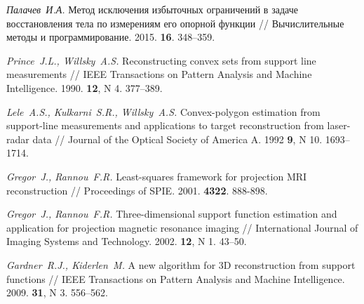 \documentclass[a4paper, 10pt]{article}
\theoremstyle{definition}
\theoremstyle{plain}
\theoremstyle{plain}
\begin{document}
\begin{thebibliography}{50}

\emph{Палачев~И.А.}
Метод исключения избыточных ограничений в задаче восстановления тела по
измерениям его опорной функции //
Вычислительные методы и программирование.
2015.
\textbf{16}.
348--359.

\emph{Prince~J.L., Willsky~A.S.}
Reconstructing convex sets from support line measurements //
IEEE Transactions on Pattern Analysis and Machine Intelligence.
1990.
\textbf{12},
N 4.
377--389.

\emph{Lele~A.S., Kulkarni~S.R., Willsky~A.S.}
Convex-polygon estimation from support-line measurements and applications to
target reconstruction from laser-radar data //
Journal of the Optical Society of America A.
1992
\textbf{9},
N 10.
1693--1714.

\emph{Gregor~J., Rannou~F.R.}
Least-squares framework for projection {MRI} reconstruction //
Proceedings of SPIE.
2001.
\textbf{4322}.
888-898.

\emph{Gregor~J., Rannou~F.R.}
Three-dimensional support function estimation and application for projection
magnetic resonance imaging //
International Journal of Imaging Systems and Technology.
2002.
\textbf{12},
N 1.
43--50.

\emph{Gardner~R.J., Kiderlen~M.}
A new algorithm for 3D reconstruction from support functions //
IEEE Transactions on Pattern Analysis and Machine Intelligence.
2009.
\textbf{31},
N 3.
556--562.

\end{thebibliography}
\end{document}
